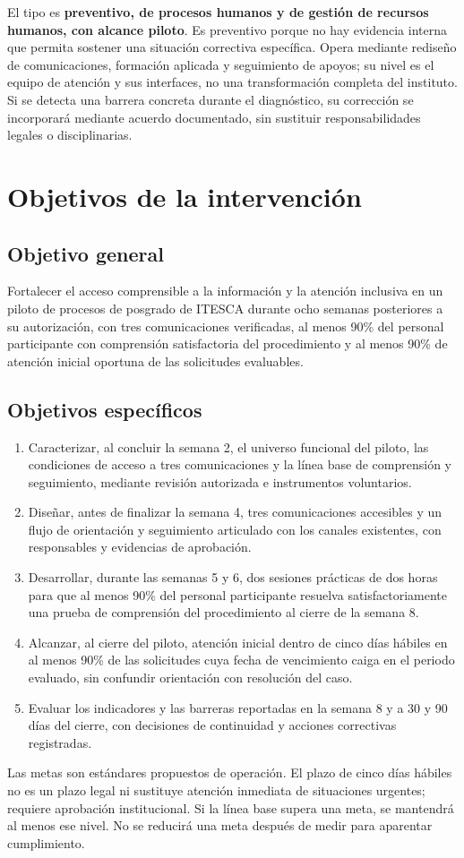 \documentclass[12pt,letterpaper,oneside]{article}
\begin{document}
El tipo es \textbf{preventivo, de procesos humanos y de gestión de recursos humanos, con alcance piloto}. Es preventivo porque no hay evidencia interna que permita sostener una situación correctiva específica. Opera mediante rediseño de comunicaciones, formación aplicada y seguimiento de apoyos; su nivel es el equipo de atención y sus interfaces, no una transformación completa del instituto. Si se detecta una barrera concreta durante el diagnóstico, su corrección se incorporará mediante acuerdo documentado, sin sustituir responsabilidades legales o disciplinarias.

\section{Objetivos de la intervención}
\subsection{Objetivo general}
Fortalecer el acceso comprensible a la información y la atención inclusiva en un piloto de procesos de posgrado de ITESCA durante ocho semanas posteriores a su autorización, con tres comunicaciones verificadas, al menos 90\% del personal participante con comprensión satisfactoria del procedimiento y al menos 90\% de atención inicial oportuna de las solicitudes evaluables.

\subsection{Objetivos específicos}
\begin{enumerate}
\item Caracterizar, al concluir la semana 2, el universo funcional del piloto, las condiciones de acceso a tres comunicaciones y la línea base de comprensión y seguimiento, mediante revisión autorizada e instrumentos voluntarios.
\item Diseñar, antes de finalizar la semana 4, tres comunicaciones accesibles y un flujo de orientación y seguimiento articulado con los canales existentes, con responsables y evidencias de aprobación.
\item Desarrollar, durante las semanas 5 y 6, dos sesiones prácticas de dos horas para que al menos 90\% del personal participante resuelva satisfactoriamente una prueba de comprensión del procedimiento al cierre de la semana 8.
\item Alcanzar, al cierre del piloto, atención inicial dentro de cinco días hábiles en al menos 90\% de las solicitudes cuya fecha de vencimiento caiga en el periodo evaluado, sin confundir orientación con resolución del caso.
\item Evaluar los indicadores y las barreras reportadas en la semana 8 y a 30 y 90 días del cierre, con decisiones de continuidad y acciones correctivas registradas.
\end{enumerate}
Las metas son estándares propuestos de operación. El plazo de cinco días hábiles no es un plazo legal ni sustituye atención inmediata de situaciones urgentes; requiere aprobación institucional. Si la línea base supera una meta, se mantendrá al menos ese nivel. No se reducirá una meta después de medir para aparentar cumplimiento.
\end{document}
